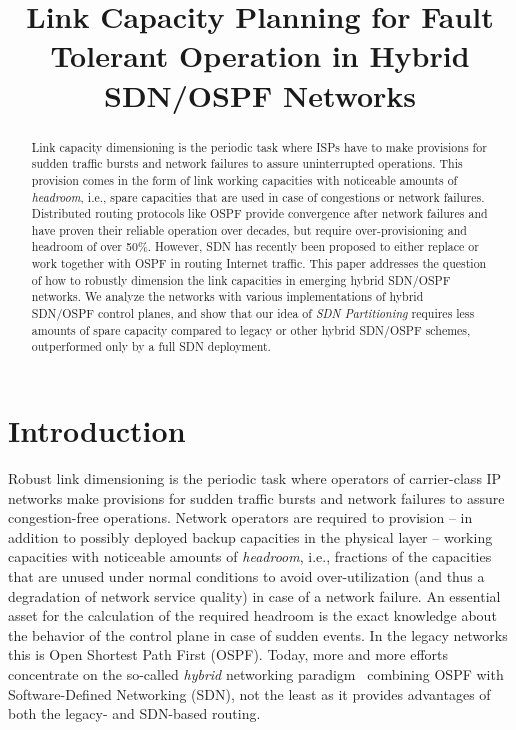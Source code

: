 \documentclass[10pt, conference]{IEEEtran}
\begin{document}
\title{Link Capacity Planning for Fault Tolerant Operation in Hybrid SDN/OSPF Networks}

\author{
}


\maketitle

\begin{abstract}
Link capacity dimensioning is the periodic task where ISPs have to make provisions for sudden traffic bursts and network failures to assure uninterrupted operations. This provision comes in the form of link working capacities with noticeable amounts of \emph{headroom}, i.e., spare capacities that are used in case of congestions or network failures. Distributed routing protocols like OSPF provide convergence after network failures and have proven their reliable operation over decades, but require over-provisioning and headroom of over 50\%. However, SDN has recently been proposed to either replace or work together with OSPF in routing Internet traffic. This paper addresses the question of how to robustly dimension the link capacities in emerging hybrid SDN/OSPF networks. We analyze the networks with various implementations of hybrid SDN/OSPF control planes, and show that our idea of \emph{SDN Partitioning} requires less amounts of spare capacity compared to legacy or other hybrid SDN/OSPF schemes, outperformed only by a full SDN deployment.
\end{abstract}







\section{Introduction}

\par Robust link dimensioning is the periodic task where operators of carrier-class IP networks make provisions for sudden traffic bursts and network failures to assure congestion-free operations. Network operators are required to provision -- in addition to possibly deployed backup capacities in the physical layer -- working capacities with noticeable amounts of \emph{headroom}, i.e., fractions of the capacities that are unused under normal conditions to avoid over-utilization (and thus a degradation of network service quality) in case of a network failure. An essential asset for the calculation of the required headroom is the exact knowledge about the behavior of the control plane in case of sudden events. In the legacy networks this is Open Shortest Path First (OSPF). Today, more and more efforts concentrate on the so-called \emph{hybrid} networking paradigm~\cite{hybrid_1, hybrid_2, hybrid_3, hybrid_4, Brockners, Vissicchio2, tamal_ICC} combining OSPF with Software-Defined Networking (SDN), not the least as it provides advantages of both the legacy- and SDN-based routing.
\end{document}
